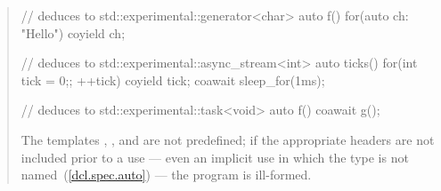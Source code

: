 \begin{quote}
\begin{itemize}
\end{itemize}
\enterexample
\begin{codeblock}
// deduces to std::experimental::generator<char>
auto f() { for(auto ch: "Hello") coyield ch; }

// deduces to std::experimental::async_stream<int>
auto ticks() {
  for(int tick = 0;; ++tick) {
    coyield tick;
    coawait sleep_for(1ms);
  }
}

// deduces to std::experimental::task<void>
auto f() {  coawait g(); }

\end{codeblock}
\exitexample

\pnum
The templates  , 
, and %
{} are not predefined;
if the appropriate headers are not included prior to a use --- even an implicit use in which the type is not
named~(\ref{dcl.spec.auto}) --- the program is ill-formed.
\end{quote}
